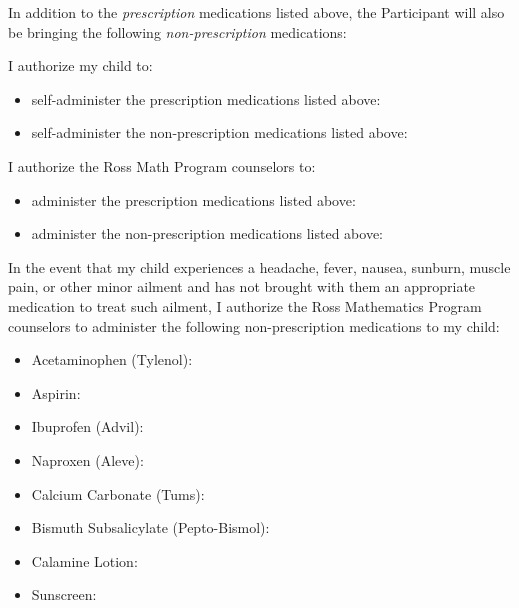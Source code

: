 \documentclass{ross}
\begin{document}
In addition to the \emph{prescription} medications listed above, the Participant will also be bringing the following \emph{non-prescription} medications:

\begin{tcolorbox}[enhanced,overlay unbroken and first={
  \node[anchor=north,inner sep=1pt] at (frame.south) {\scriptsize\color{gray} non-prescription medications};
  }]
  \vspace{1in}
\end{tcolorbox}

I authorize my child to:
\begin{itemize}
  \item self-administer the \phantom{non-}prescription medications listed above: \hfill \genblank[yes]{\phantom{XX}} \genblank[no]{\phantom{XX}}
  \item self-administer the non-prescription medications listed above:  \hfill \genblank[yes]{\phantom{XX}} \genblank[no]{\phantom{XX}}
\end{itemize}

I authorize the Ross Math Program counselors to:
\begin{itemize}
  \item administer the \phantom{non-}prescription medications listed above:  \hfill \genblank[yes]{\phantom{XX}} \genblank[no]{\phantom{XX}}
  \item administer the non-prescription medications listed above:  \hfill \genblank[yes]{\phantom{XX}} \genblank[no]{\phantom{XX}}
\end{itemize}

In the event that my child experiences a headache, fever, nausea,
sunburn, muscle pain, or other minor ailment and has not brought with
them an appropriate medication to treat such ailment, I authorize the
Ross Mathematics Program counselors to administer the following
non-prescription medications to my child:

\begin{itemize}
  \item Acetaminophen (Tylenol): \hfill \genblank[yes]{\phantom{XX}} \genblank[no]{\phantom{XX}}
  \item Aspirin: \hfill \genblank[yes]{\phantom{XX}} \genblank[no]{\phantom{XX}}
  \item Ibuprofen (Advil):  \hfill \genblank[yes]{\phantom{XX}} \genblank[no]{\phantom{XX}} 
  \item Naproxen (Aleve):  \hfill \genblank[yes]{\phantom{XX}} \genblank[no]{\phantom{XX}} 
  \item Calcium Carbonate (Tums):  \hfill \genblank[yes]{\phantom{XX}} \genblank[no]{\phantom{XX}}
  \item Bismuth Subsalicylate (Pepto-Bismol):  \hfill \genblank[yes]{\phantom{XX}} \genblank[no]{\phantom{XX}} 
  \item Calamine Lotion:  \hfill \genblank[yes]{\phantom{XX}} \genblank[no]{\phantom{XX}}
  \item Sunscreen:  \hfill \genblank[yes]{\phantom{XX}} \genblank[no]{\phantom{XX}}
\end{itemize}
\end{document}
